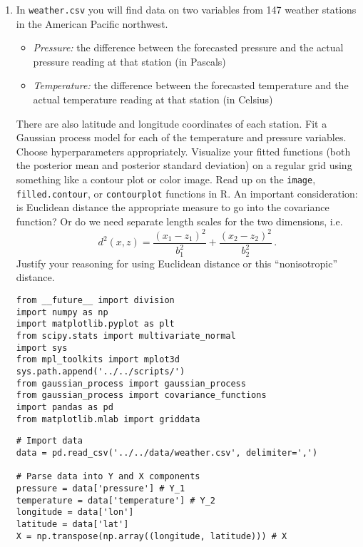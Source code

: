\documentclass[10pt]{article}
\begin{document}
\begin{enumerate}[label=(\Alph*)]
            \item In \verb|weather.csv| you will find data on two variables from 147 weather stations in the American Pacific northwest.
            \begin{itemize}
                \item \textit{Pressure:} the difference between the forecasted pressure and the actual pressure reading at that station (in Pascals)
                \item \textit{Temperature:} the difference between the forecasted temperature and the actual temperature reading at that station (in Celsius)
            \end{itemize}
            There are also latitude and longitude coordinates of each  station.  Fit a Gaussian process model for each of the temperature and pressure variables.  Choose hyperparameters appropriately.  Visualize your fitted functions (both the posterior mean and posterior standard deviation) on a regular grid using something like a contour plot or color image.  Read up on the \verb|image|, \verb|filled.contour|, or \verb|contourplot| functions in R.  An important consideration: is Euclidean distance the appropriate measure to go into the covariance function?  Or do we need separate length scales for the two dimensions, i.e.
            $$
            d^2(x, z) = \frac{(x_1 - z_1)^2}{b_1^2} +  \frac{(x_2 - z_2)^2}{b_2^2} \, .
            $$
            Justify your reasoning for using Euclidean distance or this ``nonisotropic'' distance.

        \begin{lstlisting}
from __future__ import division
import numpy as np 
import matplotlib.pyplot as plt
from scipy.stats import multivariate_normal
import sys
from mpl_toolkits import mplot3d
sys.path.append('../../scripts/')
from gaussian_process import gaussian_process
from gaussian_process import covariance_functions
import pandas as pd
from matplotlib.mlab import griddata
        \end{lstlisting}

        \begin{lstlisting}
# Import data
data = pd.read_csv('../../data/weather.csv', delimiter=',')

# Parse data into Y and X components
pressure = data['pressure'] # Y_1
temperature = data['temperature'] # Y_2
longitude = data['lon']
latitude = data['lat']
X = np.transpose(np.array((longitude, latitude))) # X
        \end{lstlisting}


\end{enumerate}
\end{document}
